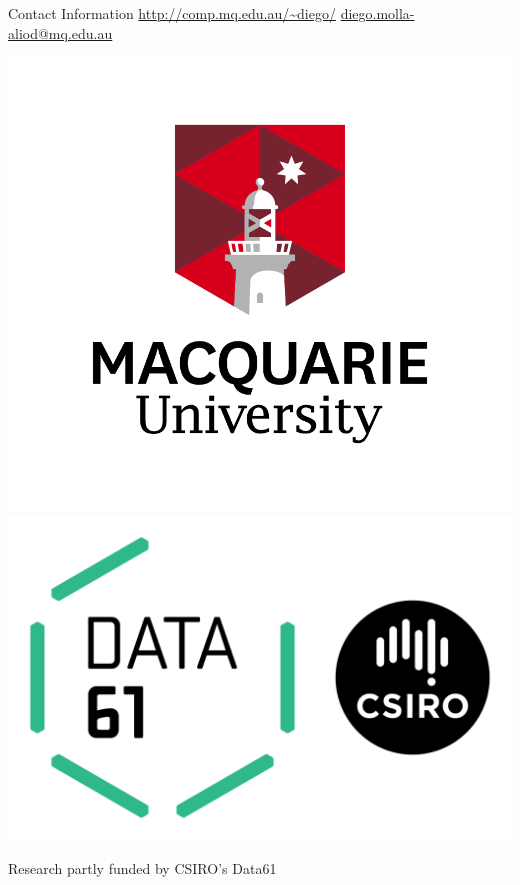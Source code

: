 \documentclass[final]{beamer}
\newlength{\twocolwid}
\begin{document}
\begin{frame}[t]
\begin{columns}[t]
\begin{column}{\twocolwid}
\vspace{-1cm}

\begin{alertblock}{Contact Information}
\Large\href{http://comp.mq.edu.au/~diego/}{http://comp.mq.edu.au/\~{}diego/}\hfill
\href{mailto:diego.molla-aliod@mq.edu.au}{diego.molla-aliod@mq.edu.au}

\end{alertblock}

\includegraphics[align=t,width=0.3\linewidth]{Macquarie.png}
\hfill
\includegraphics[align=t,width=0.3\linewidth]{data61.png}



\hfill Research partly funded by CSIRO's Data61


\end{column} %

\end{columns} %


\end{frame} %
\end{document}
